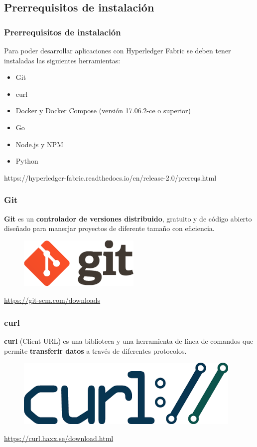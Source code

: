 \documentclass{beamer}
\begin{document}
	\subsection{Prerrequisitos de instalación}
	
	\begin{frame}
		\frametitle{Prerrequisitos de instalación}
		Para poder desarrollar aplicaciones con Hyperledger Fabric se deben tener instaladas las siguientes herramientas:
		\begin{itemize}
			\item Git
			\item curl
			\item Docker y Docker Compose (versión 17.06.2-ce o superior)
			\item Go
			\item Node.js y NPM
			\item Python
		\end{itemize}
		\begin{center}
			\tiny{https://hyperledger-fabric.readthedocs.io/en/release-2.0/prereqs.html}
		\end{center}
	\end{frame}
	
	\begin{frame}
		\frametitle{Git}
		\textbf{Git} es un \textbf{controlador de versiones distribuido}, gratuito y de código abierto diseñado para manerjar proyectos de diferente tamaño con eficiencia.
		\begin{figure}[h]
			\includegraphics[scale=.3]{git}
			\centering
		\end{figure}
		\begin{center}
			\tiny{\url{https://git-scm.com/downloads}}
		\end{center}
	\end{frame}

	\begin{frame}
		\frametitle{curl}
		\textbf{curl} (Client URL) es una biblioteca y una herramienta de línea de comandos que permite \textbf{transferir datos} a través de diferentes protocolos.
		\begin{figure}[h]
			\includegraphics[scale=.3]{curl}
			\centering
		\end{figure}
		\begin{center}
			\tiny{\url{https://curl.haxx.se/download.html}}
		\end{center}
	\end{frame}
\end{document}
